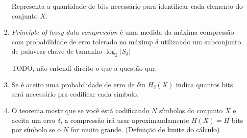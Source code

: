 \begin{enumerate}
	Representa a quantidade de bits necessário para identificar cada elemento do conjunto $X$.
	
	\item
	\textit{Principle of lossy data compression} é uma medida da máxima compressão com probabilidade de erro tolerado no máximp $\delta$ utilizando um subconjunto de palavras-chave de tamanho $\log _2 |S_\delta|$
	
	TODO, não entendi direito o que a questão qur.
	
	\item
	Se é aceito uma probabilidade de erro de $\delta$m $H_\delta (X)$ indica quantos bits será necessário pra codificar cada símbolo.
	
	\item
	O teorema mostr que se você está codificando $N$ símbolos do conjunto $X$ e aceita um erro $\delta$, a compressão irá usar aproximandamente $H(X) = H$ bits por símbolo se o $N$ for muito grande. (Definição de limite do cálculo)
	
\end{enumerate}